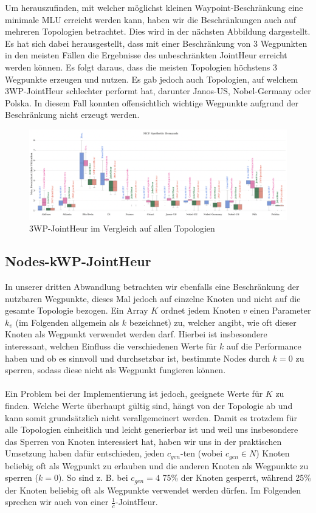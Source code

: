 \documentclass[sigconf,noacm,review]{acmart}
\begin{document}
Um herauszufinden, mit welcher möglichst kleinen Waypoint-Beschränkung eine minimale MLU erreicht werden kann, haben wir die Beschränkungen auch 
auf mehreren Topologien betrachtet. Dies wird in der nächsten Abbildung dargestellt. Es hat sich dabei herausgestellt, dass mit einer Beschränkung von 3 Wegpunkten in den meisten Fällen
die Ergebnisse des unbeschränkten JointHeur erreicht werden können. Es folgt daraus, dass die meisten Topologien höchstens 3 Wegpunkte erzeugen und nutzen.
Es gab jedoch auch Topologien, auf welchem  3WP-JointHeur schlechter performt hat, darunter Janos-US, Nobel-Germany oder Polska. In diesem Fall
konnten offensichtlich wichtige Wegpunkte aufgrund der Beschränkung nicht erzeugt werden.
\begin{figure}[h]
  \centering
  \includegraphics[width=\linewidth]{abbildungen/allTopologieskwp}
  \caption{3WP-JointHeur im Vergleich auf allen Topologien}
\end{figure}

\subsection{Nodes-kWP-JointHeur}
In unserer dritten Abwandlung betrachten wir ebenfalls eine Beschränkung der nutzbaren Wegpunkte, dieses Mal jedoch auf einzelne Knoten und nicht auf die gesamte Topologie bezogen.
Ein Array $K$ ordnet jedem Knoten $v$ einen Parameter $k_v$ (im Folgenden allgemein als $k$ bezeichnet) zu, welcher angibt, wie oft dieser Knoten als Wegpunkt verwendet werden darf. Hierbei ist insbesondere interessant, welchen Einfluss die verschiedenen Werte für $k$ auf die Performance haben und ob es sinnvoll und durchsetzbar ist, bestimmte Nodes durch $k=0$ zu sperren, sodass diese nicht als Wegpunkt fungieren können.
\\
\\
Ein Problem bei der Implementierung ist jedoch, geeignete Werte für $K$ zu finden. Welche Werte überhaupt gültig sind, hängt von der Topologie ab und kann somit grundsätzlich nicht verallgemeinert werden. Damit es trotzdem für alle Topologien einheitlich und leicht generierbar ist und weil uns insbesondere das Sperren von Knoten interessiert hat, haben wir uns in der praktischen Umsetzung haben dafür entschieden, jeden $c_{gen}$-ten (wobei $c_{gen} \in N$) Knoten beliebig oft als Wegpunkt zu erlauben und die anderen Knoten als Wegpunkte zu sperren ($k=0$). So sind z. B. bei  $c_{gen} = 4$ 75\% der Knoten gesperrt, während 25\% der Knoten beliebig oft als Wegpunkte verwendet werden dürfen. Im Folgenden sprechen wir auch von einer $\frac{1}{c}$-JointHeur.
\end{document}
